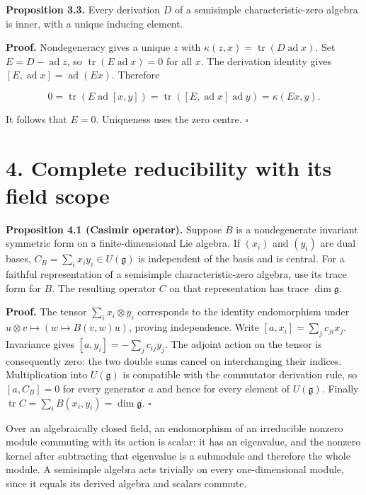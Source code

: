 \documentclass[11pt,a4paper,openany]{report}
\begin{document}
\textbf{Proposition 3.3.} Every derivation \(D\) of a semisimple characteristic-zero algebra is inner, with a unique inducing element.

\textbf{Proof.} Nondegeneracy gives a unique \(z\) with \(\kappa(z,x)=\operatorname{tr}(D\operatorname{ad}x)\). Set \(E=D-\operatorname{ad}z\), so \(\operatorname{tr}(E\operatorname{ad}x)=0\) for all \(x\). The derivation identity gives \([E,\operatorname{ad}x]=\operatorname{ad}(Ex)\). Therefore

\[
0=\operatorname{tr}(E\operatorname{ad}[x,y])
=\operatorname{tr}([E,\operatorname{ad}x]\operatorname{ad}y)
=\kappa(Ex,y).
\tag{3.3}
\]

It follows that \(E=0\). Uniqueness uses the zero centre. \(\square\)

\section{4. Complete reducibility with its field scope}\label{AG-RG-S06-complete-reducibility-with-its-field-scope}

\textbf{Proposition 4.1 (Casimir operator).} Suppose \(B\) is a nondegenerate invariant symmetric form on a finite-dimensional Lie algebra. If \((x_i)\) and \((y_i)\) are dual bases, \(C_B=\sum_i x_i y_i\in U(\mathfrak g)\) is independent of the basis and is central. For a faithful representation of a semisimple characteristic-zero algebra, use its trace form for \(B\). The resulting operator \(C\) on that representation has trace \(\dim\mathfrak g\).

\textbf{Proof.} The tensor \(\sum_i x_i\otimes y_i\) corresponds to the identity endomorphism under \(u\otimes v\mapsto(w\mapsto B(v,w)u)\), proving independence. Write \([a,x_i]=\sum_j c_{ji}x_j\). Invariance gives \([a,y_i]=-\sum_j c_{ij}y_j\). The adjoint action on the tensor is consequently zero: the two double sums cancel on interchanging their indices. Multiplication into \(U(\mathfrak g)\) is compatible with the commutator derivation rule, so \([a,C_B]=0\) for every generator \(a\) and hence for every element of \(U(\mathfrak g)\). Finally \(\operatorname{tr}C=\sum_i B(x_i,y_i)=\dim\mathfrak g\). \(\square\)

Over an algebraically closed field, an endomorphism of an irreducible nonzero module commuting with its action is scalar: it has an eigenvalue, and the nonzero kernel after subtracting that eigenvalue is a submodule and therefore the whole module. A semisimple algebra acts trivially on every one-dimensional module, since it equals its derived algebra and scalars commute.
\end{document}

